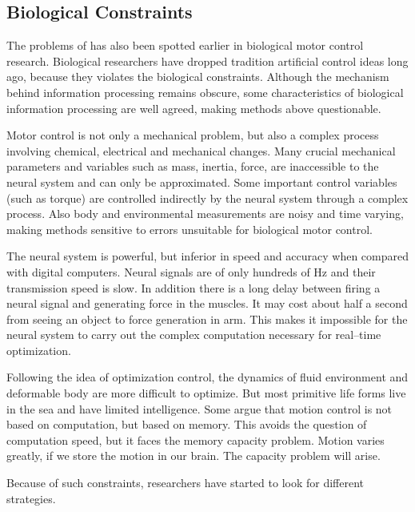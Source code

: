 \subsection{Biological Constraints}
The problems of \cms has also been spotted earlier in biological motor control research.
Biological researchers have dropped  tradition artificial control ideas long ago, because they  violates the biological constraints.
Although the mechanism behind information processing remains obscure, some characteristics of biological information processing are well agreed,  making  \cms methods above questionable\citep{Glynn2003}. 
  
\begin{itemize}
Motor control is not only a mechanical problem, but also a complex process involving chemical, electrical and mechanical changes.
Many crucial mechanical parameters and variables such as mass, inertia, force, are inaccessible to the neural system and can only be approximated. 
Some important control variables (such as torque) are controlled indirectly by the neural system through a complex process.
Also body and environmental measurements are noisy and time varying, making methods sensitive to errors unsuitable for biological motor control.

The neural system is powerful, but inferior in speed and accuracy when compared with digital computers. 
Neural signals are of only hundreds of Hz and their transmission speed is slow.
In addition there is a long delay between firing a neural signal and generating force in the muscles.
It may cost about half a second from seeing an object to force generation in arm. 
This makes it impossible for the neural system to carry out the complex computation necessary for real–time optimization.


Following the idea of optimization control, the dynamics of fluid environment and deformable body are more difficult to optimize. 
But most primitive life forms live in the sea and have limited intelligence. 
Some argue that motion control is not based on computation, but based on memory.
This avoids the question of computation speed, but it faces the memory capacity problem. 
Motion varies greatly, if we store the motion in our brain.
The capacity problem will arise.
\end{itemize}

Because of such constraints, researchers have started to look for different strategies.

